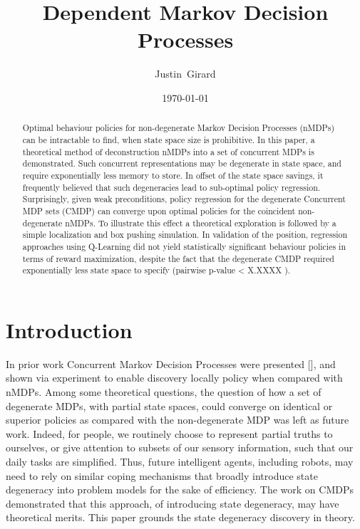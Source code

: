 \documentclass[compsoc,journal,letterpaper,10pt,draftcls,twocolumn]{IEEEtran}
\begin{document}
\title{Dependent Markov Decision Processes}

\author{Justin~Girard%
}

\date{\today}

\maketitle

\begin{abstract}
Optimal behaviour policies for non-degenerate Markov Decision Processes
(nMDPs) can be intractable to find, when state space size is
prohibitive. In this paper, a theoretical method of deconstruction nMDPs
into a set of concurrent MDPs is demonstrated. Such concurrent
representations may be degenerate in state space, and require
exponentially less memory to store. In offset of the state space
savings, it frequently believed that such degeneracies lead to
sub-optimal policy regression. Surprisingly, given weak preconditions,
policy regression for the degenerate Concurrent MDP sets (CMDP) can
converge upon optimal policies for the coincident non-degenerate nMDPs.
To illustrate this effect a theoretical exploration is followed by a
simple localization and box pushing simulation. In validation of the
position, regression approaches using Q-Learning did not yield
statistically significant behaviour policies in terms of reward
maximization, despite the fact that the degenerate CMDP required
exponentially less state space to specify (pairwise p-value \textless{}
X.XXXX ).
\end{abstract}

\section{Introduction}\label{introduction}

In prior work Concurrent Markov Decision Processes were presented
{[}{]}, and shown via experiment to enable discovery locally policy when
compared with nMDPs. Among some theoretical questions, the question of
how a set of degenerate MDPs, with partial state spaces, could converge
on identical or superior policies as compared with the non-degenerate
MDP was left as future work. Indeed, for people, we routinely choose to
represent partial truths to ourselves, or give attention to subsets of
our sensory information, such that our daily tasks are simplified. Thus,
future intelligent agents, including robots, may need to rely on similar
coping mechanisms that broadly introduce state degeneracy into problem
models for the sake of efficiency. The work on CMDPs demonstrated that
this approach, of introducing state degeneracy, may have theoretical
merits. This paper grounds the state degeneracy discovery in theory.
\end{document}
